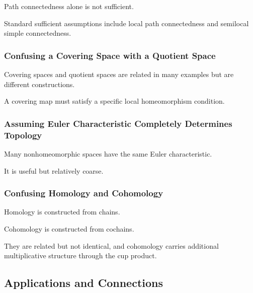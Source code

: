 Path connectedness alone is not sufficient.

Standard sufficient assumptions include local path connectedness and
semilocal simple connectedness.

\subsubsection{Confusing a Covering Space with a Quotient Space}

Covering spaces and quotient spaces are related in many examples but are
different constructions.

A covering map must satisfy a specific local homeomorphism condition.

\subsubsection{Assuming Euler Characteristic Completely Determines Topology}

Many nonhomeomorphic spaces have the same Euler characteristic.

It is useful but relatively coarse.

\subsubsection{Confusing Homology and Cohomology}

Homology is constructed from chains.

Cohomology is constructed from cochains.

They are related but not identical, and cohomology carries additional
multiplicative structure through the cup product.

\subsection{Applications and Connections}
\label{subsec:algebraic-topology-applications}

